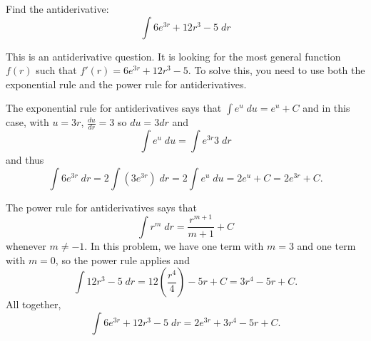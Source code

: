 \documentclass{ximera}
\author{Emma Smith Zbarsky}
\begin{document}
\begin{exercise}

Find the antiderivative: \[\int 6e^{3r} +12r^3 -5\; dr\]


\begin{hint}
This is an antiderivative question. It is looking for the most general
function $f(r)$ such that $f'(r) = 6e^{3r}+12r^3-5$. To solve this, you
need to use both the exponential rule and the power rule for
antiderivatives.
\end{hint}


\begin{hint}
The exponential rule for antiderivatives says that
$\int e^u \; du = e^u+C$ and in this case, with $u= 3r$,
$\frac{du}{dr} = 3$ so $du = 3dr$ and
\[\int e^{u}\; du = \int e^{3r} 3\; dr\] and thus
\[\int 6e^{3r}\; dr = 2 \int \left(3e^{3r}\right)\; dr = 2\int e^u\; du = 2e^u +C = 2e^{3r}+C.\]

The power rule for antiderivatives says that
\[\int r^m \; dr = \frac{r^{m+1}}{m+1}+C\] whenever $m\neq -1$. In this
problem, we have one term with $m=3$ and one term with $m=0$, so the
power rule applies and
\[\int 12r^3-5\; dr = 12\left(\frac{r^4}{4}\right)-5r+C = 3r^4-5r+C.\]
All together, \[\int 6e^{3r}+12r^3-5\; dr = 2e^{3r}+3r^4-5r+C.\]
\end{hint}


\begin{multipleChoice}
\end{multipleChoice}

\end{exercise}
\end{document}
